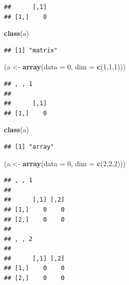 \documentclass[]{book}
\newenvironment{Shaded}{\begin{snugshade}}{\end{snugshade}}
\newcommand{\KeywordTok}[1]{\textcolor[rgb]{0.13,0.29,0.53}{\textbf{#1}}}
\newcommand{\DataTypeTok}[1]{\textcolor[rgb]{0.13,0.29,0.53}{#1}}
\newcommand{\DecValTok}[1]{\textcolor[rgb]{0.00,0.00,0.81}{#1}}
\newcommand{\StringTok}[1]{\textcolor[rgb]{0.31,0.60,0.02}{#1}}
\newcommand{\NormalTok}[1]{#1}
\begin{document}
\begin{verbatim}
##      [,1]
## [1,]    0
\end{verbatim}

\begin{Shaded}
\begin{Highlighting}[]
\KeywordTok{class}\NormalTok{(a)}
\end{Highlighting}
\end{Shaded}

\begin{verbatim}
## [1] "matrix"
\end{verbatim}

\begin{Shaded}
\begin{Highlighting}[]
\NormalTok{(a <-}\StringTok{ }\KeywordTok{array}\NormalTok{(}\DataTypeTok{data =} \DecValTok{0}\NormalTok{, }\DataTypeTok{dim =} \KeywordTok{c}\NormalTok{(}\DecValTok{1}\NormalTok{,}\DecValTok{1}\NormalTok{,}\DecValTok{1}\NormalTok{)))}
\end{Highlighting}
\end{Shaded}

\begin{verbatim}
## , , 1
## 
##      [,1]
## [1,]    0
\end{verbatim}

\begin{Shaded}
\begin{Highlighting}[]
\KeywordTok{class}\NormalTok{(a)}
\end{Highlighting}
\end{Shaded}

\begin{verbatim}
## [1] "array"
\end{verbatim}

\begin{Shaded}
\begin{Highlighting}[]
\NormalTok{(a <-}\StringTok{ }\KeywordTok{array}\NormalTok{(}\DataTypeTok{data =} \DecValTok{0}\NormalTok{, }\DataTypeTok{dim =} \KeywordTok{c}\NormalTok{(}\DecValTok{2}\NormalTok{,}\DecValTok{2}\NormalTok{,}\DecValTok{2}\NormalTok{)))}
\end{Highlighting}
\end{Shaded}

\begin{verbatim}
## , , 1
## 
##      [,1] [,2]
## [1,]    0    0
## [2,]    0    0
## 
## , , 2
## 
##      [,1] [,2]
## [1,]    0    0
## [2,]    0    0
\end{verbatim}
\end{document}
